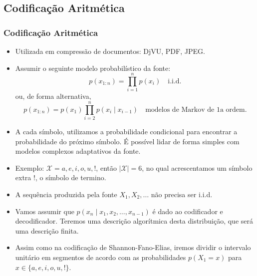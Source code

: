 \subsection{Codificação Aritmética}
\begin{frame}[allowframebreaks]
  \frametitle{Codificação Aritmética}
  \begin{itemize}
  \item Utilizada em compressão de documentos: DjVU, PDF, JPEG.
  \item Assumir o seguinte modelo probabilístico da fonte:
	\begin{equation}
	p(x_{1:n}) = \prod_{i=1}^{n} p(x_i) \quad \text{i.i.d.}
	\end{equation}
	ou, de forma alternativa,
	\begin{equation}
	p(x_{1:n}) = p(x_1) \prod_{i=2}^{n} p(x_i \mid x_{i-1}) \quad \text{modelos de Markov de 1a ordem}.
	\end{equation}
  \item A cada símbolo, utilizamos a probabilidade condicional para encontrar a probabilidade
	do próximo símbolo. É possível lidar de forma simples com modelos complexos adaptativos da fonte.
  \item Exemplo: $\mathcal{X} = {a,e,i,o,u,!}$, então $\vert \mathcal{X} \vert = 6$, no qual acrescentamos um símbolo extra $!$, 
	o símbolo de termino. 
  \item A sequência produzida pela fonte $X_1, X_2, \ldots$ não precisa ser i.i.d.
  \item Vamos assumir que $p(x_n \mid x_1, x_2, \ldots, x_{n-1})$ é dado ao codificador e decodificador.
	Teremos uma descrição algorítmica desta distribuição, que será uma descrição finita.
  \item Assim como na codificação de Shannon-Fano-Elias, iremos dividir o intervalo unitário em 
	segmentos de acordo com as probabilidades $p(X_1 = x)$ para $x \in \{a,e,i,o,u,!\}$.

\end{itemize}
\end{frame}
